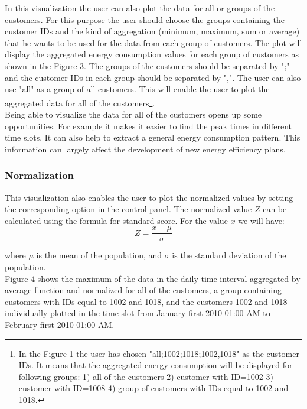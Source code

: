 \documentclass{sig-alternate-10pt}
\begin{document}
In this visualization the user can also plot the data for all or groups of the customers. For this purpose the user should choose the groups containing the customer IDs and the kind of aggregation (minimum, maximum, sum or average) that he wants to be used for the data from each group of customers. The plot will display the aggregated energy consumption values for each group of customers as shown in the Figure 3. The groups of the customers should be separated by ";" and the customer IDs in each group should be separated by ",". The user can also use "all" as a group of all customers. This will enable the user to plot the aggregated data for all of the customers\footnote{In the Figure 1 the user has chosen "all;1002;1018;1002,1018" as the customer IDs. It means that the aggregated energy consumption will be displayed for following groups: 1) all of the customers 2) customer with ID=1002 3) customer with ID=1008 4) group of customers with IDs equal to 1002 and 1018.}.\\

Being able to visualize the data for all of the customers opens up some opportunities. For example it makes it easier to find the peak times in different time slots. It can also help to extract a general energy consumption pattern. This information can largely affect the development of new energy efficiency plans.\\  


\subsubsection{Normalization} 
This visualization also enables the user to plot the normalized values by setting the corresponding option in the control panel. The normalized value $Z$ can be calculated using the formula for standard score. For the value $x$ we will have: 
\begin{displaymath} Z = \frac{x - \mu}{\sigma} 
\end{displaymath}

where $\mu$ is the mean of the population, and $\sigma$ is the standard deviation of the population.\\

Figure 4 shows the maximum of the data in the daily time interval aggregated by average function and normalized for all of the customers, a group containing customers with IDs equal to 1002 and 1018, and the customers 1002 and 1018 individually plotted in the time slot from January first 2010 01:00 AM to February first 2010 01:00 AM. \\
\end{document}
